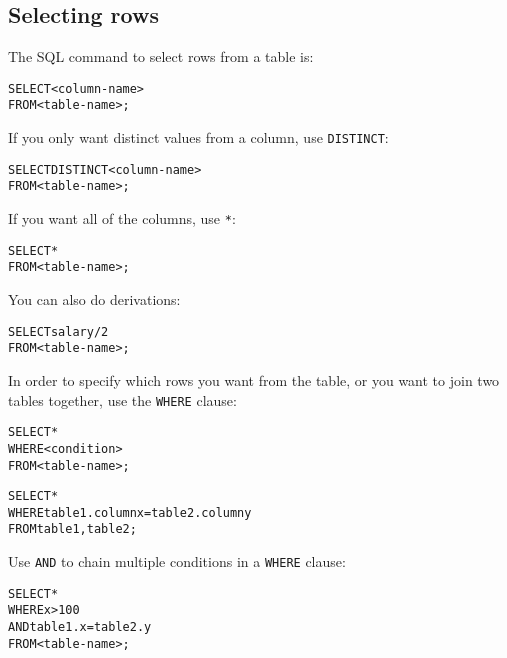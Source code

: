 \begin{mymulticols}

  \subsection{Selecting rows}

  The SQL command to select rows from a table is:

  \begin{alltt}
  	SELECT <column-name>\\
  	FROM <table-name>;
  \end{alltt}

  If you only want distinct values from a column, use \texttt{DISTINCT}:

  \begin{alltt}
  	SELECT DISTINCT <column-name>\\
  	FROM <table-name>;
  \end{alltt}

  If you want all of the columns, use \texttt{*}:

  \begin{alltt}
  	SELECT *\\
  	FROM <table-name>;
  \end{alltt}

  You can also do derivations:

  \begin{alltt}
  	SELECT salary/2\\
  	FROM <table-name>;
  \end{alltt}

  In order to specify which rows you want from the table, or you want to join two
  tables together, use the \texttt{WHERE} clause:

  \begin{alltt}
  	SELECT *\\
  	WHERE <condition>\\
  	FROM <table-name>;
  \end{alltt}

  \begin{alltt}
  	SELECT *\\
  	WHERE table1.columnx = table2.columny\\
  	FROM table1, table2;
  \end{alltt}

  Use \texttt{AND} to chain multiple conditions in a \texttt{WHERE} clause:

  \begin{alltt}
  	SELECT *\\
  	WHERE x > 100\\
  	AND table1.x = table2.y\\
  	FROM <table-name>;
  \end{alltt}


\end{mymulticols}
